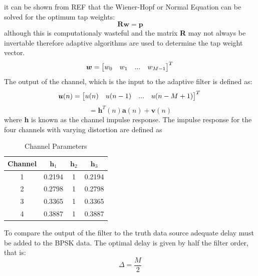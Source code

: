 \documentclass[journal]{IEEEtran}
\begin{document}
it can be shown from REF that the Wiener-Hopf or Normal Equation can be solved for
the optimum tap weights:
 $$\boldsymbol{Rw} = \boldsymbol{p}$$
although this is computationaly wasteful and the matrix \textbf{R} may not
always be invertable therefore adaptive algorithms are used to determine the tap weight vector.
\[
\boldsymbol{w} =\begin{bmatrix}w_0 & w_1 & ... & w_{M-1}\end{bmatrix}^T\\\mbox{}
\]
The output of the channel, which is the input to the adaptive filter is defined as:
\[
\boldsymbol{u}(n) =\begin{bmatrix}u(n) & u(n-1) & ...  & u(n-M+1)\end{bmatrix}^T\\\mbox{}
\]
$$= \boldsymbol{h}^T(n)\boldsymbol{a}(n) + \boldsymbol{v}(n)$$
where  \textbf{h} is known as the channel impulse response. The impulse response for the four channels
with varying distortion are defined as
\begin{table}[H]
\centering
 \begin{tabular}{ | c || c | c | c |}
    \hline
    Channel & $\boldsymbol{h}_1$ & $\boldsymbol{h}_2$ & $\boldsymbol{h}_3$\\
    \hline\hline
    1 & 0.2194 & 1 & 0.2194 \\
    \hline
    2 & 0.2798 & 1 & 0.2798 \\
    \hline
    3 & 0.3365 & 1 & 0.3365\\
    \hline
    4 & 0.3887 & 1 & 0.3887\\
    \hline
  \end{tabular}
  \caption{Channel Parameters}
  \label{table:channel}
\end{table}
To compare the output of the filter to the truth data source adequate delay must be added to the BPSK data. The optimal delay is given by
half the filter order, that is:
$$\Delta = \dfrac{M}{2}$$
\end{document}
